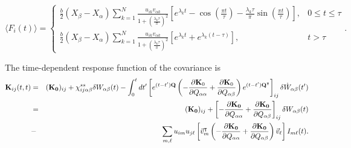 \begin{equation}
\langle { F}_i(t)\rangle= \begin{cases} \frac{b}{2}(X_\beta-X_\alpha)\sum_{k=1}^N \frac{u_{ik}v_{\alpha k}}{1+\left(\frac{\lambda_k\tau}{\pi}\right)^2}\left[ e^{\lambda_k t} - \cos\left( \frac{\pi t}{\tau} \right) - \frac{\lambda_k \tau}{\pi}\sin\left( \frac{\pi t}{\tau} \right) \right], &0\leq t\leq\tau\\
\frac{b}{2}(X_\beta-X_\alpha)\sum_{k=1}^N \frac{u_{ik}v_{\alpha k}}{1+\left(\frac{\lambda_k\tau}{\pi}\right)^2} \left[ e^{\lambda_k t}+e^{\lambda_k(t-\tau)} \right], & t>\tau
\end{cases}.
\end{equation}

The time-dependent response function of the covariance is
\begin{eqnarray}
    {\bf K}_{ij}(t,t) &=& ({\bf K_0})_{ij} + \chi_{ij\alpha\beta}^{ss} \delta W_{\alpha\beta}(t)-\int_0^t dt' \left[ e^{(t-t'){\bf Q}}\left(-\frac{\partial {\bf K}_0}{\partial Q_{\alpha\alpha}} +\frac{\partial {\bf K}_0}{\partial Q_{\alpha\beta}}\right) e^{(t-t'){\bf Q}^\intercal} \right]_{ij} \delta \dot{W}_{\alpha\beta}(t')\nonumber\\
    &=&({\bf K_0})_{ij}+\left[- \frac{\partial {\bf K_0}}{\partial Q_{\alpha\alpha}}+\frac{\partial {\bf K_0}}{\partial Q_{\alpha\beta}} \right]_{ij}\delta W_{\alpha\beta}(t)\nonumber\\
    &-& \sum_{m,\ell} u_{im}u_{j\ell} \left[ \vec{v}^\intercal_m \left( -\frac{\partial {\bf K_0}}{\partial Q_{\alpha\alpha}}+\frac{\partial {\bf K_0}}{\partial Q_{\alpha\beta}} \right) \vec{v}_\ell \right] I_{m\ell}(t).
\end{eqnarray}
